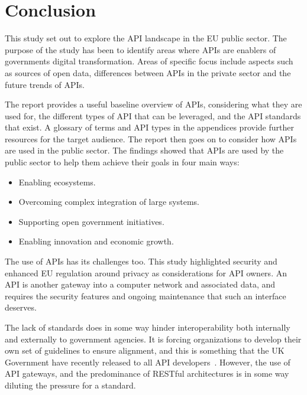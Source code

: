 \chapter{Conclusion}

\ifpdf
\graphicspath{{Conclusion/Figs/Raster/}{Conclusion/Figs/PDF/}{Conclusion/Figs/}}
\else
\graphicspath{{Conclusion/Figs/Vector/}{Conclusion/Figs/}}
\fi

This study set out to explore the API landscape in the EU public sector. The
purpose of the study has been to identify areas where APIs are enablers of governments
digital transformation. Areas of specific focus
include aspects such as sources of open data, differences between APIs in the private sector
and the future trends of APIs.

The report provides a useful baseline overview of APIs, considering what they are
used for, the different types of API that can be leveraged, and the API standards
that exist. A glossary of terms and API types in the appendices provide further
resources for the target audience. The report then goes on to consider how APIs
are used in the public sector. The findings showed that APIs are used by the public
sector to help them achieve their goals in four main ways:
\begin{itemize}
	\item Enabling ecosystems.
	\item Overcoming complex integration of large systems.
	\item Supporting open government initiatives.
	\item Enabling innovation and economic growth.
\end{itemize}

The use of APIs has its challenges too. This study highlighted security
and enhanced EU regulation around privacy as considerations for API owners. An API
is another gateway into a computer network and associated data, and requires the security features and ongoing maintenance that such an interface deserves.

The lack of standards does in some way hinder interoperability both internally and
externally to government agencies. It is forcing organizations to develop their own set of guidelines to ensure alignment, and this is something that the UK
Government have recently released to all API developers~\citep{gov_uk_api}. However, the use
of API gateways, and the predominance of RESTful architectures is in some way diluting
the pressure for a standard.

